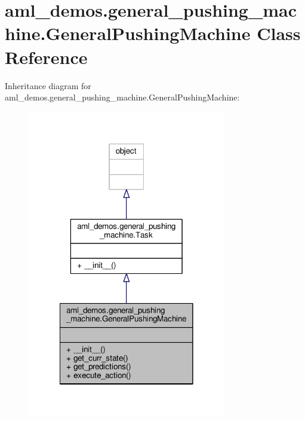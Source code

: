 \hypertarget{classaml__demos_1_1general__pushing__machine_1_1_general_pushing_machine}{\section{aml\-\_\-demos.\-general\-\_\-pushing\-\_\-machine.\-General\-Pushing\-Machine Class Reference}
\label{classaml__demos_1_1general__pushing__machine_1_1_general_pushing_machine}
}


Inheritance diagram for aml\-\_\-demos.\-general\-\_\-pushing\-\_\-machine.\-General\-Pushing\-Machine\-:\nopagebreak
\begin{figure}[H]
\begin{center}
\leavevmode
\includegraphics[width=246pt]{classaml__demos_1_1general__pushing__machine_1_1_general_pushing_machine__inherit__graph}
\end{center}
\end{figure}


